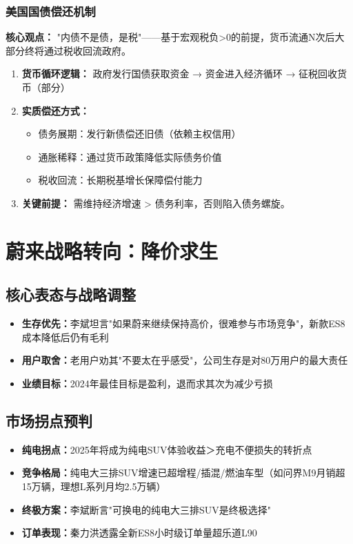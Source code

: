 \subsubsection{美国国债偿还机制}
\textbf{核心观点：} "内债不是债，是税"——基于宏观税负>0的前提，货币流通N次后大部分终将通过税收回流政府。
\begin{enumerate}
    \item \textbf{货币循环逻辑：} 政府发行国债获取资金 → 资金进入经济循环 → 征税回收货币（部分）
    \item \textbf{实质偿还方式：}
    \begin{itemize}
        \item 债务展期：发行新债偿还旧债（依赖主权信用）
        \item 通胀稀释：通过货币政策降低实际债务价值
        \item 税收回流：长期税基增长保障偿付能力
    \end{itemize}
    \item \textbf{关键前提：} 需维持经济增速 > 债务利率，否则陷入债务螺旋。
\end{enumerate}


\section{蔚来战略转向：降价求生}
\subsection{核心表态与战略调整}
\begin{itemize}
    \item \textbf{生存优先：}李斌坦言"如果蔚来继续保持高价，很难参与市场竞争"，新款ES8成本降低后仍有毛利
    \item \textbf{用户取舍：}老用户劝其"不要太在乎感受"，公司生存是对80万用户的最大责任
    \item \textbf{业绩目标：}2024年最佳目标是盈利，退而求其次为减少亏损
\end{itemize}

\subsection{市场拐点预判}
\begin{itemize}
    \item \textbf{纯电拐点：}2025年将成为纯电SUV体验收益＞充电不便损失的转折点
    \item \textbf{竞争格局：}纯电大三排SUV增速已超增程/插混/燃油车型（如问界M9月销超15万辆，理想L系列月均2.5万辆）
    \item \textbf{终极方案：}李斌断言"可换电的纯电大三排SUV是终极选择"
    \item \textbf{订单表现：}秦力洪透露全新ES8小时级订单量超乐道L90
\end{itemize}

